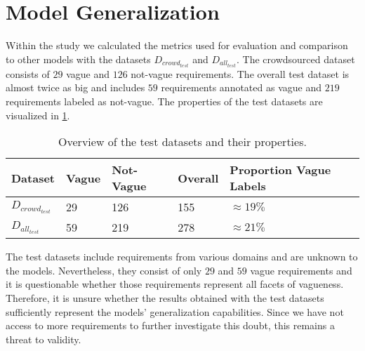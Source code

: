 \section{Model Generalization}
\label{chp:threats_to_validity:sec:model_generalization}

Within the study we calculated the metrics used for evaluation and comparison to other models with the datasets $D_{crowd_{test}}$ and $D_{all_{test}}$.
The crowdsourced dataset consists of $29$ vague and $126$ not-vague requirements.
The overall test dataset is almost twice as big and includes $59$ requirements annotated as vague and $219$ requirements labeled as not-vague.
The properties of the test datasets are visualized in \cref{tab:threats_to_validity:sec:model_generalization:test_datasets}.

\begin{table}[htpb]
    \centering
    \begin{tabular}{l|llll}
        \toprule
        Dataset & Vague & Not-Vague & Overall & Proportion Vague Labels\\
        \midrule
        $D_{crowd_{test}}$ & 29 & 126 & 155 & $\approx19\%$\\
        $D_{all_{test}}$ & 59 & 219 & 278 &  $\approx21\%$\\
        \bottomrule
    \end{tabular}
    \caption[Overview of test datasets]{Overview of the test datasets and their properties.}\label{tab:threats_to_validity:sec:model_generalization:test_datasets}
\end{table}

The test datasets include requirements from various domains \parencite{Kummeth:2020} and are unknown to the models.
Nevertheless, they consist of only $29$ and $59$ vague requirements and it is questionable whether those requirements represent all facets of vagueness.
Therefore, it is unsure whether the results obtained with the test datasets sufficiently represent the models' generalization capabilities.
Since we have not access to more requirements to further investigate this doubt, this remains a threat to validity.

